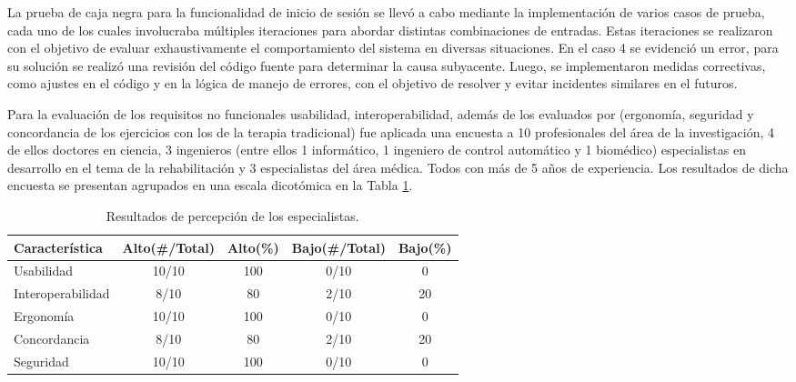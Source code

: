 \newpage
La prueba de caja negra para la funcionalidad de inicio de sesión se llevó a cabo mediante la implementación de varios casos de prueba, cada uno de los cuales involucraba múltiples iteraciones para abordar distintas combinaciones de entradas. Estas iteraciones se realizaron con el objetivo de evaluar exhaustivamente el comportamiento del sistema en diversas situaciones. En el caso 4 se evidenció un error, para su solución se realizó una revisión del código fuente para determinar la causa subyacente. Luego, se implementaron medidas correctivas, como ajustes en el código y en la lógica de manejo de errores, con el objetivo de resolver y evitar incidentes similares en el futuros.

Para la evaluación de los requisitos no funcionales usabilidad, interoperabilidad, además de los evaluados por \cite{franco2016sistema} (ergonomía, seguridad y concordancia de los ejercicios con los de la terapia tradicional) fue aplicada una encuesta a 10 profesionales del área de la investigación, 4 de ellos doctores en ciencia, 3 ingenieros (entre ellos 1 informático, 1 ingeniero de control automático y 1 biomédico) especialistas en desarrollo en el tema de la rehabilitación y 3 especialistas del área médica. Todos con más de 5 años de experiencia. Los resultados de dicha encuesta se presentan agrupados en una escala dicotómica en la Tabla \ref{table:test}.

\begin{table}[ht]
    \centering
    \begin{tabular}{p{3cm} c c c c}
        \hline
        Característica      &  Alto(\#/Total)   &  Alto(\%) & Bajo(\#/Total)  & Bajo(\%) \\\hline
        Usabilidad          &  10/10  &  100  & 0/10  &   0\\
        Interoperabilidad   &  8/10   &  80   & 2/10  &   20\\
        Ergonomía           &  10/10  &  100  & 0/10  &   0\\
        Concordancia        &  8/10   &  80   & 2/10  &   20\\
        Seguridad           &  10/10  &  100  & 0/10  &   0\\
        \hline        
    \end{tabular}        
    \caption{Resultados de percepción de los especialistas.}
    \label{table:test}
\end{table}

